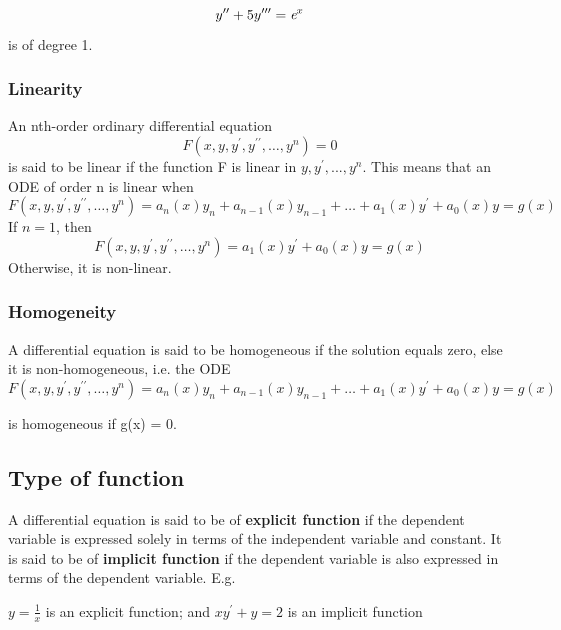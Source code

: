 \documentclass[12pt]{report}
\begin{document}
	\begin{equation}
	y^{\prime\prime} + 5y^{\prime\prime\prime} = \textit e^x  
	\end{equation}
	is of degree 1.
	
	\subsubsection{Linearity} 
	An nth-order ordinary differential equation 
	\begin{equation}
	F(x,y,y^\prime,y^{\prime\prime},\dots,y^n ) = 0
	\end{equation} is said to be linear if the function F is linear in $y, y^\prime, ... , y^n$. This means that an ODE of order n is linear when
	 \begin{equation}
	F(x,y,y^\prime,y^{\prime\prime},\dots,y^n ) = a_n(x)y_n + a_{n-1}(x)y_{n-1} + \dots + a_1(x)y^\prime + a_0(x)y = g(x)  
	 \end{equation}
	If $n = 1$, then
		\begin{equation}
		F(x,y,y^\prime,y^{\prime\prime},\dots,y^n ) = a_1(x)y^\prime + a_0(x)y = g(x)
		\end{equation} Otherwise, it is non-linear.
	
	\subsubsection{Homogeneity}
	 A differential equation is said to be homogeneous if the solution equals zero, else it is non-homogeneous, i.e. the ODE \medskip
	 \begin{equation}
	 F(x,y,y^\prime,y^{\prime\prime},\dots,y^n ) = a_n(x)y_n + a_{n-1}(x)y_{n-1} + \dots + a_1(x)y^\prime + a_0(x)y = g(x) 
	 \end{equation}
	 
	 is homogeneous if g(x) = 0.
	
\subsection{Type of function}
	 A differential equation is said to be of \textbf{explicit function} if the dependent variable is expressed solely in terms of the independent variable and constant. It is said to be of \textbf{implicit function} if the dependent variable is also expressed in terms of the dependent variable. E.g.
	 
		$y = \frac{1}{x}$  is an explicit function; and
		$xy^\prime + y = 2$  is an implicit function
	
\end{document}
